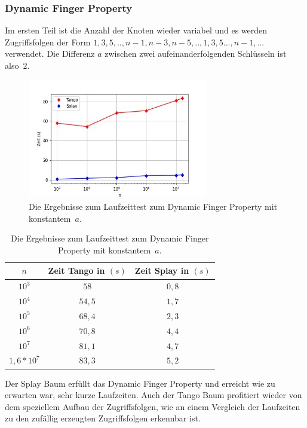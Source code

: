 \documentclass[a4paper,12pt]{article}
\begin{document}
\subsubsection{Dynamic Finger Property}
Im ersten Teil ist die Anzahl der Knoten wieder variabel und es werden Zugriffsfolgen der Form  $1, 3, 5,..,n-1, n-3, n-5, ..,1, 3, 5..., n-1,...$ verwendet. Die Differenz $a$ zwischen zwei aufeinanderfolgenden Schlüsseln ist \mbox{also $2$}.
\begin{figure}[H]
	\centering
	\includegraphics[width=0.7\textwidth]{Medien/laufzeittest/diagramm/dynamicfinger}
	\caption{Die Ergebnisse zum Laufzeittest zum Dynamic Finger Property mit \mbox{konstantem $a$.}}
\end{figure}
\begin{table}[H]
	\begin{center}
		\begin{tabular}[c]{|c|c|c|}
			\hline
			$n$ & Zeit Tango in $\left(s\right)$ &Zeit Splay in $\left(s\right)$ \\
			\hline
			$10^3$ & $58$ &$0,8$ \\
			\hline
			$10^4$  & $54,5$ &$1,7$  \\
			\hline
			$10^5$  & $68,4$ &$2,3$  \\
			\hline
			$10^6$  & $70,8$ &$4,4$  \\
			\hline
			$10^7$  & $81,1$ &$4,7$  \\
			\hline
			$1,6 *10^7$  & $83,3$ &$5,2$  \\
			\hline
		\end{tabular}
		\caption{Die Ergebnisse zum Laufzeittest zum Dynamic Finger Property mit \mbox{konstantem $a$.}} 
	\end{center}
\end{table}
\noindent Der Splay Baum erfüllt das Dynamic Finger Property und erreicht wie zu erwarten war, sehr kurze Laufzeiten. Auch der Tango Baum profitiert wieder von dem speziellem Aufbau der Zugriffsfolgen, wie an einem Vergleich der Laufzeiten zu den zufällig erzeugten Zugriffsfolgen erkennbar ist. 
\end{document}
